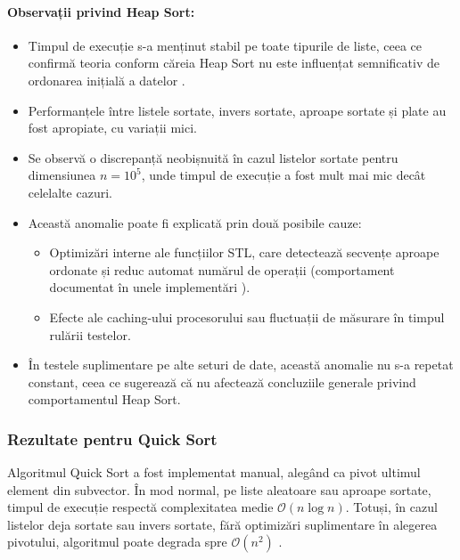 \documentclass{article}
\begin{document}
\paragraph*{Observații privind Heap Sort:}
\begin{itemize}
    \item Timpul de execuție s-a menținut stabil pe toate tipurile de liste, ceea ce confirmă teoria conform căreia Heap Sort nu este influențat semnificativ de ordonarea inițială a datelor \cite{bigocheatsheet}.
    \item Performanțele între listele sortate, invers sortate, aproape sortate și plate au fost apropiate, cu variații mici.
    \item Se observă o discrepanță neobișnuită în cazul listelor sortate pentru dimensiunea $n = 10^5$, unde timpul de execuție a fost mult mai mic decât celelalte cazuri.
    \item Această anomalie poate fi explicată prin două posibile cauze:
    \begin{itemize}
        \item Optimizări interne ale funcțiilor STL, care detectează secvențe aproape ordonate și reduc automat numărul de operații (comportament documentat în unele implementări \cite{cppreferenceheap}).
        \item Efecte ale caching-ului procesorului sau fluctuații de măsurare în timpul rulării testelor.
    \end{itemize}
    \item În testele suplimentare pe alte seturi de date, această anomalie nu s-a repetat constant, ceea ce sugerează că nu afectează concluziile generale privind comportamentul Heap Sort.
\end{itemize}





\subsubsection{Rezultate pentru Quick Sort}

Algoritmul Quick Sort a fost implementat manual, alegând ca pivot ultimul element din subvector. În mod normal, pe liste aleatoare sau aproape sortate, timpul de execuție respectă complexitatea medie $\mathcal{O}(n\log n)$. Totuși, în cazul listelor deja sortate sau invers sortate, fără optimizări suplimentare în alegerea pivotului, algoritmul poate degrada spre $\mathcal{O}(n^2)$ \cite{bigocheatsheet}.
\end{document}
